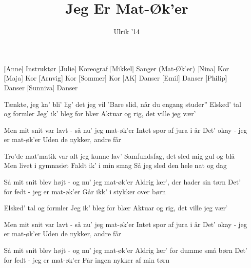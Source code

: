 \documentclass[a4paper,11pt]{article}
\title{Jeg Er Mat-Øk'er}
\author{Ulrik '14}
\begin{document}
\maketitle

\begin{roles}
[Anne] Instruktør
[Julie] Koreograf
[Mikkel] Sanger (Mat-Øk'er)
[Nina] Kor
[Maja] Kor
[Arnvig] Kor
[Sommer] Kor
[AK] Danser
[Emil] Danser
[Philip] Danser
[Sunniva] Danser
\end{roles}

\begin{song}
 Tænkte, jeg ka' bli' lig' det jeg vil
'Bare slid, når du engang studer''
Elsked' tal og formler
Jeg' ik' bleg for blær
Aktuar og rig, det ville jeg vær'

 Men mit snit var lavt - så nu' jeg mat-øk'er
Intet spor af jura i år
Det' okay - jeg er mat-øk'er
Uden de nykker, andre får

 Tro'de mat'matik var alt jeg kunne lav'
Samfundsfag, det sled mig gul og blå
Men livet i gymnasiet
Faldt ik' i min smag
Så jeg sled den hele nat og dag

 Så mit snit blev højt - og nu' jeg mat-øk'er
Aldrig lær', der hader sin tørn
Det' for fedt - jeg er mat-øk'er
Går ikk' i stykker over børn

 Elsked' tal og formler
Jeg ik' bleg for blær
Aktuar og rig, det ville jeg vær'

 Men mit snit var lavt - så nu' jeg mat-øk'er
Intet spor af jura i år
Det' okay - jeg er mat-øk'er
Uden de nykker, andre får

 Så mit snit blev højt - og nu' jeg mat-øk'er
Aldrig lær' for dumme små børn
Det' for fedt - jeg er mat-øk'er
Får ingen nykker af min tørn
\end{song}
\end{document}
